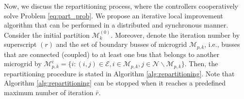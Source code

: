 Now, we discuss the repartitioning process, where the controllers cooperatively solve Problem \eqref{eq:part_prob}. We propose an iterative local improvement algorithm that can be performed in a distributed and synchronous manner. %
Consider the initial partition $\boldsymbol{\mathcal{M}}_k^{(0)}$. Moreover, denote the iteration number by superscript $(r)$ and the set of boundary busses of microgrid $\mathcal{M}_{p,k}$, i.e., busses that are connected (coupled) to at least one bus that belongs to another microgrid by $\mathcal{M}_{p,k}^{\mathrm{c}}=\{i: (i,j) \in \mathcal{E}, i\in \mathcal{M}_{p,k}, j\in \mathcal{N}\backslash\mathcal{M}_{p,k} \}$. Then, the repartitioning procedure is stated in Algorithm \ref{alg:repartitioning}. %
Note that Algorithm \ref{alg:repartitioning} can be stopped when it reaches a predefined maximum  number of iteration $\bar{r}$.  \color{black}

